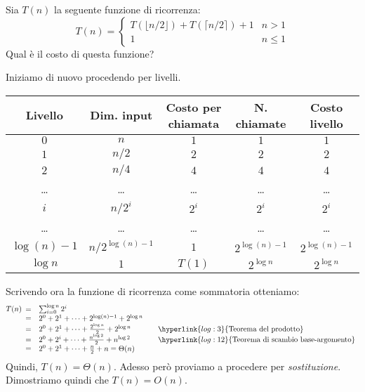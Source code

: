 \begin{eg}
    Sia $T(n)$ la seguente funzione di ricorrenza:
    \[T(n)=\begin{cases}
        T(\lfloor n/2\rfloor)+T(\lceil n/2\rceil)+1 & n>1\\
        1 & n\leq1
    \end{cases}\]
    Qual è il costo di questa funzione?
    
    \bigskip\noindent
    Iniziamo di nuovo procedendo per livelli.

    \begin{table}[h!]
        \renewcommand{\arraystretch}{1.2}
        \centering
        \begin{tabular}{|c|c|c|c|c|}
            \hline
            \textbf{Livello} & \textbf{Dim. input} & \textbf{Costo per chiamata} & \textbf{N. chiamate} & \textbf{Costo livello}\\
            \hline
            $0$ & $n$ & $1$ & $1$ & $1$\\
            \hline
            $1$ & $n/2$ & $2$ & $2$ & $2$\\
            \hline
            $2$ & $n/4$ & $4$ & $4$ & $4$\\
            \hline
            \dots & \dots & \dots & \dots & \dots\\
            \hline
            $i$ & $n/2^i$ & $2^i$ & $2^i$ & $2^i$\\
            \hline
            \dots & \dots & \dots & \dots & \dots\\
            \hline
            $\log(n)-1$ & $n/2^{\log(n)-1}$ & $1$ & $2^{\log(n)-1}$ & $2^{\log(n)-1}$\\
            \hline
            $\log n$ & $1$ & $T(1)$ & $2^{\log n}$ & $2^{\log n}$\\
            \hline
        \end{tabular}
    \end{table}\noindent
    Scrivendo ora la funzione di ricorrenza come sommatoria otteniamo:
    \[T(n)\begin{array}[t]{cll}
        = & \sum_{i=0}^{\log n}2^i\\
        = & 2^0+2^1+\dots+2^{\log(n)-1}+2^{\log n}\\
        = & 2^0+2^1+\dots+\frac{2^{\log n}}{2}+2^{\log n} & \quad\hyperlink{log:3}{\text{Teorema del prodotto}}\\
        = & 2^0+2^i+\dots+\frac{n^{\log 2}}{2}+n^{\log 2} & \quad\hyperlink{log:12}{\text{Teorema di scambio base-argomento}}\\
        = & 2^0+2^1+\dots+\frac{n}{2}+n=\Theta(n)
    \end{array}\]
    Quindi, $T(n)=\Theta(n)$. Adesso però proviamo a procedere per \emph{sostituzione}.
    Dimostriamo quindi che $T(n)=O(n)$.


\end{eg}
